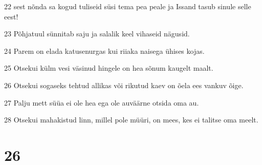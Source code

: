 \par 22 sest nõnda sa kogud tuliseid süsi tema pea peale ja Issand tasub sinule selle eest!
\par 23 Põhjatuul sünnitab saju ja salalik keel vihaseid nägusid.
\par 24 Parem on elada katusenurgas kui riiaka naisega ühises kojas.
\par 25 Otsekui külm vesi väsinud hingele on hea sõnum kaugelt maalt.
\par 26 Otsekui sogaseks tehtud allikas või rikutud kaev on õela ees vankuv õige.
\par 27 Palju mett süüa ei ole hea ega ole auväärne otsida oma au.
\par 28 Otsekui mahakistud linn, millel pole müüri, on mees, kes ei talitse oma meelt.

\chapter{26}

